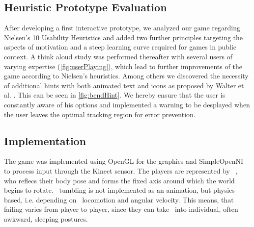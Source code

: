 \documentclass{chi-ext}
\begin{document}
\subsection{Heuristic Prototype Evaluation}
After developing a first interactive prototype, we  analyzed our game regarding Nielsen’s 10 Usability Heuristics \cite{nielsen1995usability} and added two further principles targeting the aspects of motivation and a steep learning curve required for games in public context.
%
A think aloud study was performed thereafter with several users of varying expertise (\autoref{fig:userPlaying}), which lead to further improvements of the game according to Nielsen's heuristics. Among others we discovered the necessity of additional hints with both animated text and icons as proposed by Walter et al. \cite{walter2013strikeapose}. This can be seen in \autoref{fig:bendHint}. We hereby ensure that the user is constantly aware of his options and implemented a warning to be desplayed when the user leaves the optimal tracking region for error prevention.
\subsection{Implementation}
The game was implemented using OpenGL for the graphics and SimpleOpenNI to process input through the Kinect sensor. The players are represented by \ed\ , who reflecs their body pose and forms the fixed axis around which the world begins to rotate. \eds\ tumbling is not implemented as an animation, but physics based, i.e. depending on \eds\ locomotion and angular velocity. This means, that failing varies from player to player, since they can take \ed\ into individual, often awkward, sleeping postures.
\end{document}

